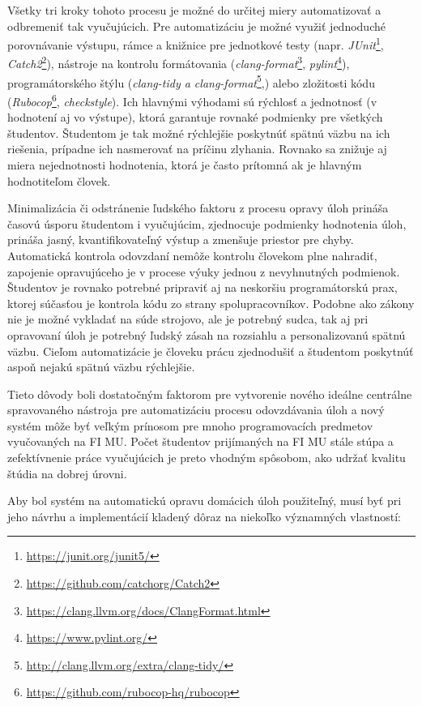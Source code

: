 \documentclass[
  digital, %
  twoside, %
  table,   %
  lof,     %
  lot,     %
]{fithesis3}
\begin{document}
Všetky tri kroky tohoto procesu je možné do určitej miery automatizovať a odbremeniť tak vyučujúcich. Pre automatizáciu je možné využiť jednoduché porovnávanie výstupu, rámce a knižnice pre jednotkové testy (napr. \emph{JUnit}\footnote{\url{https://junit.org/junit5/}}, \emph{Catch2}\footnote{\url{https://github.com/catchorg/Catch2}}), nástroje na kontrolu formátovania (\emph{clang-format}\footnote{\url{https://clang.llvm.org/docs/ClangFormat.html}}, \textit{pylint}\footnote{\url{https://www.pylint.org/}}), programátorského štýlu (\textit{clang-tidy a clang-format}\footnote{\url{http://clang.llvm.org/extra/clang-tidy/}},) alebo zložitosti kódu (\textit{Rubocop}\footnote{\url{https://github.com/rubocop-hq/rubocop}}, \textit{checkstyle}). Ich hlavnými výhodami sú rýchlosť a jednotnosť (v hodnotení aj vo výstupe), ktorá garantuje rovnaké podmienky pre všetkých študentov. Študentom je tak možné rýchlejšie poskytnúť spätnú väzbu na ich riešenia, prípadne ich nasmerovať na príčinu zlyhania. Rovnako sa znižuje aj miera nejednotnosti hodnotenia, ktorá je často prítomná ak je hlavným hodnotiteľom človek.

Minimalizácia či odstránenie ľudského faktoru z procesu opravy úloh prináša časovú úsporu študentom i vyučujúcim, zjednocuje podmienky hodnotenia úloh, prináša jasný, kvantifikovateľný výstup a zmenšuje priestor pre chyby. Automatická kontrola odovzdaní nemôže kontrolu človekom plne nahradiť, zapojenie opravujúceho je v procese výuky jednou z nevyhnutných podmienok. Študentov je rovnako potrebné pripraviť aj na neskoršiu programátorskú prax, ktorej súčasťou je kontrola kódu zo strany spolupracovníkov\cite{code_reviews_atlassian}. Podobne ako zákony nie je možné vykladať na súde strojovo, ale je potrebný sudca, tak aj pri opravovaní úloh je potrebný ľudský zásah na rozsiahlu a personalizovanú spätnú väzbu\cite{code-feedback}. Cieľom automatizácie je človeku prácu zjednodušiť a študentom poskytnúť aspoň nejakú spätnú väzbu rýchlejšie.

Tieto dôvody boli dostatočným faktorom pre vytvorenie nového ideálne centrálne spravovaného nástroja pre automatizáciu procesu odovzdávania úloh a nový systém môže byť veľkým prínosom pre mnoho programovacích predmetov vyučovaných na FI MU. Počet študentov prijímaných na FI MU stále stúpa a zefektívnenie práce vyučujúcich je preto vhodným spôsobom, ako udržať kvalitu štúdia na dobrej úrovni.

Aby bol systém na automatickú opravu domácich úloh použiteľný, musí byť pri jeho návrhu a implementácií kladený dôraz na niekoľko významných vlastností\cite{obrien-attributes-soa}:
\end{document}
